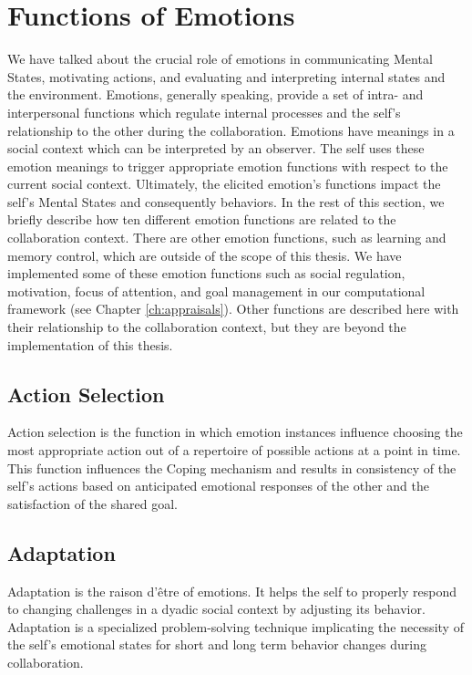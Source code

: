 \documentclass[12pt]{report}
\begin{document}
\section{Functions of Emotions}
\label{sec:emotion-functions}

We have talked about the crucial role of emotions in communicating Mental
States, motivating actions, and evaluating and interpreting internal states and
the environment. Emotions, generally speaking, provide a set of intra- and
interpersonal functions which regulate internal processes and the self's
relationship to the other during the collaboration. Emotions have meanings in a
social context which can be interpreted by an observer. The self uses these
emotion meanings to trigger appropriate emotion functions with respect to the
current social context. Ultimately, the elicited emotion's functions impact the
self's Mental States and consequently behaviors. In the rest of this section, we
briefly describe how ten different emotion functions are related to the
collaboration context. There are other emotion functions, such as learning and
memory control, which are outside of the scope of this thesis. {\color{red}We
have implemented some of these emotion functions such as social regulation,
motivation, focus of attention, and goal management in our computational
framework (see Chapter \ref{ch:appraisals}). Other functions are described here
with their relationship to the collaboration context, but they are beyond the
implementation of this thesis.}

\subsection{Action Selection} Action selection is the function in which
emotion instances influence choosing the most appropriate action out of a
repertoire of possible actions at a point in time. This function influences the
Coping mechanism and results in consistency of the self's actions based on
anticipated emotional responses of the other and the satisfaction of the shared
goal.

\subsection{Adaptation} Adaptation is the raison d'\^{e}tre of emotions. It
helps the self to properly respond to changing challenges in a dyadic social
context by adjusting its behavior. Adaptation is a specialized problem-solving
technique implicating the necessity of the self's emotional states for short and
long term behavior changes during collaboration.
\end{document}
